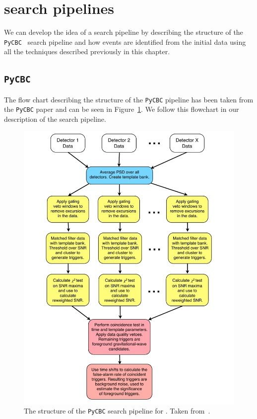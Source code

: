 \section{\label{2:sec:gw-pipelines}\Gwadj search pipelines}

We can develop the idea of a \gwadj search pipeline by describing the structure of the \texttt{PyCBC}~\cite{PyCBC:2016} search pipeline and how \gwadj events are identified from the initial \gwadj data using all the techniques described previously in this chapter.

\subsection{\label{2:sec:searching-for-gw-with-pycbc}\texttt{PyCBC}}
The flow chart describing the structure of the \texttt{PyCBC} pipeline has been taken from the \texttt{PyCBC} paper and can be seen in Figure~\ref{2:fig:pycbc-flowchart}. We follow this flowchart in our description of the search pipeline.
%
\begin{figure}
    \centering
    \includegraphics[width=1.0\linewidth]{images/2_searches/pycbc_flowchart.pdf}
    \caption{The structure of the \texttt{PyCBC} search pipeline for \gws. Taken from~\cite{PyCBC:2016}.}
    \label{2:fig:pycbc-flowchart}
\end{figure}







